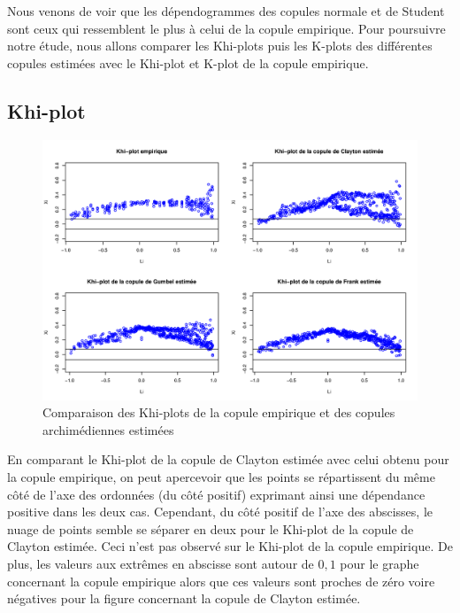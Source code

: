 Nous venons de voir que les dépendogrammes des copules normale et de Student sont ceux qui ressemblent le plus à celui de la copule empirique. Pour poursuivre notre étude, nous allons comparer les Khi-plots puis les K-plots des différentes copules estimées avec le Khi-plot et K-plot de la copule empirique.


\subsection{Khi-plot}

\noindent%
\begin{figure}[H]
    \begin{center}
      \includegraphics[width=17 cm, angle=0]{./pictures/archcmlkhiplot.png}
      \centering\caption{\label{2}Comparaison des Khi-plots de la copule empirique et des copules archimédiennes estimées}
    \end{center}
\end{figure}

En comparant le Khi-plot de la copule de Clayton estimée avec celui obtenu pour la copule empirique, on peut apercevoir que les points se répartissent du même côté de l'axe des ordonnées (du côté positif) exprimant ainsi une dépendance positive dans les deux cas. Cependant, du côté positif de l'axe des abscisses, le nuage de points semble se séparer en deux pour le Khi-plot de la copule de Clayton estimée. Ceci n'est pas observé sur le Khi-plot de la copule empirique. De plus, les valeurs aux extrêmes en abscisse sont autour de $0,1$ pour le graphe concernant la copule empirique alors que ces valeurs sont proches de zéro voire négatives pour la figure concernant la copule de Clayton estimée.

